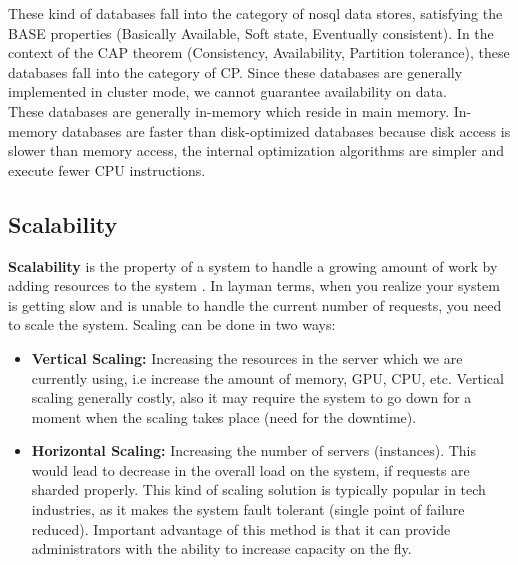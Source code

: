\documentclass[11pt]{article}
\begin{document}
These kind of databases fall into the category of nosql data stores, satisfying the 
BASE properties (Basically Available, Soft state, Eventually consistent).
In the context of the CAP theorem (Consistency, Availability, Partition tolerance), these
databases fall into the category of CP. Since these databases are generally implemented
in cluster mode, we cannot guarantee availability on data.
\\

These databases are generally in-memory which reside in main memory. In-memory
databases are faster than disk-optimized databases because disk access is 
slower than memory access, the internal optimization algorithms 
are simpler and execute fewer CPU instructions.

\subsection*{Scalability}
\textbf{Scalability} is the property of a system to handle a growing amount of work
by adding resources to the system \cite{scaling}. In layman terms, when
you realize your system is getting slow and is unable to handle
the current number of requests, you need to scale the system. Scaling 
can be done in two ways:

\begin{itemize}
    \item \textbf{Vertical Scaling:} Increasing the resources in the server
            which we are currently using, i.e increase the amount of memory, GPU,
            CPU, etc. Vertical scaling generally costly, also it may
            require the system to go down for a moment when the scaling takes
            place (need for the downtime).
    \item \textbf{Horizontal Scaling:} Increasing the number of servers (instances).
            This would lead to decrease in the overall load on the system, if requests
            are sharded properly. This kind of scaling solution is typically popular 
            in tech industries, as it makes the system fault tolerant (single point of
            failure reduced). Important advantage of this method is that it can provide
            administrators with the ability to increase capacity on the fly.
\end{itemize}
\end{document}
